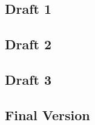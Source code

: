 \documentclass{article}
\begin{document}
\newpage
\begin{center}
\vspace*{\fill}
\LARGE
\subsection{Draft 1}
\vspace*{\fill}
%
\end{center}
\newpage
\begin{center}
\vspace*{\fill}
\LARGE
\subsection{Draft 2}
\vspace*{\fill}
%
\end{center}
\newpage
\begin{center}
\vspace*{\fill}
\LARGE
\subsection{Draft 3}
\vspace*{\fill}
%
\end{center}
\newpage
\begin{center}
\vspace*{\fill}
\LARGE
\subsection{Final Version}
\vspace*{\fill}
%
\end{center}


\end{document}
